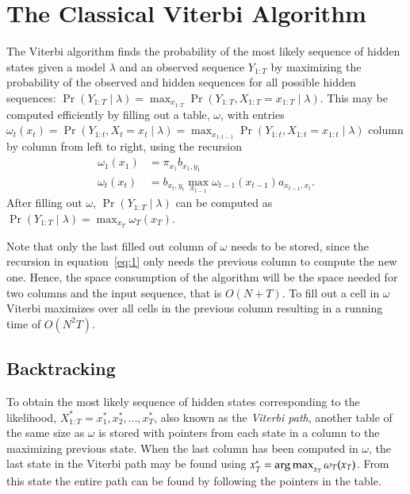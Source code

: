 \section{The Classical Viterbi Algorithm}
\label{sec:class-viterbi-algor}

The Viterbi algorithm finds the probability of the most likely sequence of
hidden states given a model $\lambda$ and an observed sequence $Y_{1:T}$ by
maximizing the probability of the observed and hidden sequences for all
possible hidden sequences: $\Pr(Y_{1:T} \mid \lambda) = \max_{x_{1:T}}
\Pr(Y_{1:T}, X_{1:T} = x_{1:T} \mid \lambda)$. This may be computed efficiently
by filling out a table, $\omega$, with entries $\omega_t(x_t) = \Pr(Y_{1:t},
X_t = x_t \mid \lambda) = \max_{x_{1:t-1}} \Pr(Y_{1:t}, X_{1:t} = x_{1:t} \mid
\lambda)$ column by column from left to right, using the recursion
\begin{equation}
  \label{eq:1}
  \begin{aligned}
    \omega_1(x_1) &= \pi_{x_1} b_{x_1, y_1} \\
    \omega_t(x_t) &= b_{x_t, y_t} \max_{x_{t - 1}} \omega_{t - 1}(x_{t - 1})
    a_{x_{t - 1}, x_t}.
  \end{aligned}
\end{equation}
After filling out $\omega$, $\Pr(Y_{1:T} \mid \lambda)$ can be computed as
$\Pr(Y_{1:T} \mid \lambda) = \max_{x_T} \omega_T(x_T)$.

Note that only the last filled out column of $\omega$ needs to be stored, since
the recursion in equation~\eqref{eq:1} only needs the previous column to
compute the new one. Hence, the space consumption of the algorithm will be the
space needed for two columns and the input sequence, that is $O(N + T)$. To
fill out a cell in $\omega$ Viterbi maximizes over all cells in the previous
column resulting in a running time of $O\left(N^2 T \right)$.

\subsection{Backtracking}
\label{sec:backtracking-1}

To obtain the most likely sequence of hidden states corresponding to the
likelihood, $X_{1:T}^* = x_1^*, x_2^*, \dots, x_T^*$, also known as the
\emph{Viterbi path}, another table of the same size as $\omega$ is stored with
pointers from each state in a column to the maximizing previous state. When the
last column has been computed in $\omega$, the last state in the Viterbi path
may be found using $x_T^* = \operatorname*{arg\,max}_{x_T} \omega_T(x_T)$. From this state the entire
path can be found by following the pointers in the table.

